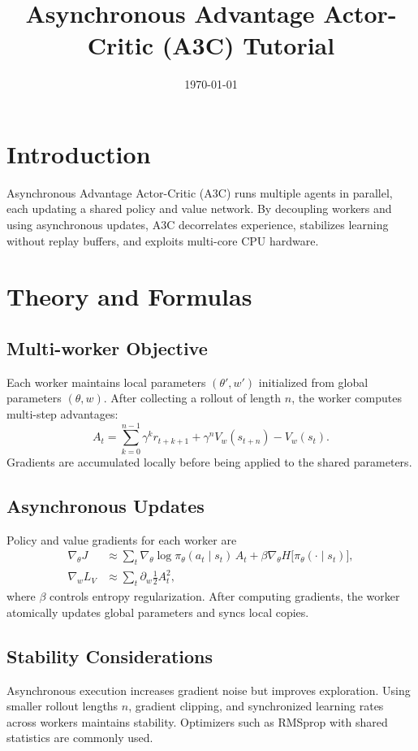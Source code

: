 ﻿\documentclass[12pt]{article}
\title{Asynchronous Advantage Actor-Critic (A3C) Tutorial}
\author{}
\date{\today}
\begin{document}
\maketitle

\section{Introduction}
Asynchronous Advantage Actor-Critic (A3C) runs multiple agents in parallel, each updating a shared policy and value network. By decoupling workers and using asynchronous updates, A3C decorrelates experience, stabilizes learning without replay buffers, and exploits multi-core CPU hardware.

\section{Theory and Formulas}
\subsection{Multi-worker Objective}
Each worker maintains local parameters \((\theta', w')\) initialized from global parameters \((\theta, w)\). After collecting a rollout of length \(n\), the worker computes multi-step advantages:
\begin{equation}
A_t = \sum_{k=0}^{n-1} \gamma^k r_{t+k+1} + \gamma^n V_w(s_{t+n}) - V_w(s_t).
\end{equation}
Gradients are accumulated locally before being applied to the shared parameters.

\subsection{Asynchronous Updates}
Policy and value gradients for each worker are
\begin{align}
\nabla_\theta J &\approx \sum_{t} \nabla_\theta \log \pi_\theta(a_t\mid s_t)\, A_t + \beta \nabla_\theta H\big[\pi_\theta(\cdot\mid s_t)\big],\\
\nabla_w L_V &\approx \sum_{t} \partial_w \frac{1}{2} A_t^2,
\end{align}
where \(\beta\) controls entropy regularization. After computing gradients, the worker atomically updates global parameters and syncs local copies.

\subsection{Stability Considerations}
Asynchronous execution increases gradient noise but improves exploration. Using smaller rollout lengths \(n\), gradient clipping, and synchronized learning rates across workers maintains stability. Optimizers such as RMSprop with shared statistics are commonly used.
\end{document}
